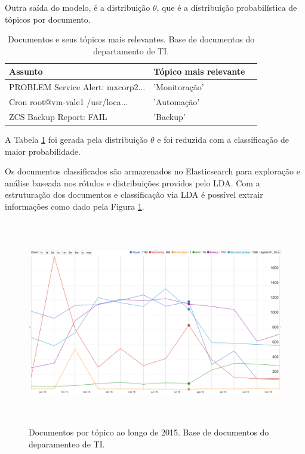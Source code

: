 \documentclass[12pt,a4paper]{article}
\begin{document}
Outra saída do modelo, é a distribuição $\theta$, que é a distribuição probabilística de tópicos por documento.

\begin{table}[H]
  \centering
  \begin{tabular}{lll}
  Assunto                               & Tópico mais relevante \\
  \hline
  PROBLEM Service Alert: mxcorp2...     & 'Monitoração' \\
  Cron root@vm-vale1 /usr/loca...       & 'Automação' \\
  ZCS Backup Report: FAIL               & 'Backup' \\
  \hline
  \end{tabular}
  \caption{Documentos e seus tópicos mais relevantes. Base de documentos do departamento de TI.}
  \label{tab-nich-documents}
\end{table}

A Tabela \ref{tab-nich-documents} foi gerada pela distribuição $\theta$ e foi reduzida com a classificação de maior 
 probabilidade.

Os documentos classificados são armazenados no Elasticsearch para exploração e análise baseada 
 nos rótulos e distribuições providos pelo LDA. Com a estruturação dos documentos e classificação via LDA é possível extrair informações como 
 dado pela Figura \ref{fig-documents-over-2015}.

\begin{figure}[H]
	\centering
    \includegraphics[height=9cm]{images/figure_7.png}
    \caption{Documentos por tópico ao longo de 2015. Base de documentos do deparamenteo de TI.}
    \label{fig-documents-over-2015}
\end{figure}
 
\end{document}
